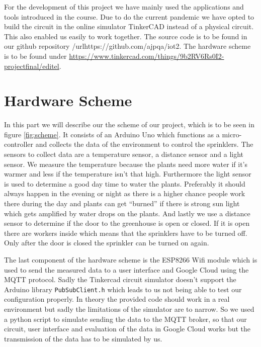 \documentclass{article}
\begin{document}
For the development of this project we have mainly used the applications and tools introduced in the course. Due to do the current pandemic we have opted to build the circuit in the online simulator TinkerCAD instead of a physical circuit. This also enabled us easily to work together. The source code is to be found in our github repository /url{https://github.com/ajpqa/iot2}. The hardware scheme is to be found under \url{https://www.tinkercad.com/things/9b2RV6Rs0I2-projectfinal/editel}.

\section{Hardware Scheme}
In this part we will describe our the scheme of our project, which is to be seen in figure \ref{fig:scheme}. It consists of an Arduino Uno which functions as a micro-controller and collects the data of the environment to control the sprinklers. The sensors to collect data are a temperature sensor, a distance sensor and a light sensor. We measure the temperature because the plants need more water if it's warmer and less if the temperature isn't that high. Furthermore the light sensor is used to determine a good day time to water the plants. Preferably it should always happen in the evening or night as there is a higher chance people work there during the day and plants can get \enquote{burned} if there is strong sun light which gets amplified by water drops on the plants. And lastly we use a distance sensor to determine if the door to the greenhouse is open or closed. If it is open there are workers inside which means that the sprinklers have to be turned off. Only after the door is closed the sprinkler can be turned on again.\par 
The last component of the hardware scheme is the ESP8266 Wifi module which is used to send the measured data to a user interface and Google Cloud using the MQTT protocol. Sadly the Tinkercad circuit simulator doesn't support the Arduino library \texttt{PubSubClient.h} which leads to us not being able to test our configuration properly. In theory the provided code should work in a real environment but sadly the limitations of the simulator are to narrow. So we used a python script to simulate sending the data to the MQTT broker, so that our circuit, user interface and evaluation of the data in Google Cloud works but the transmission of the data has to be simulated by us. 
\end{document}

